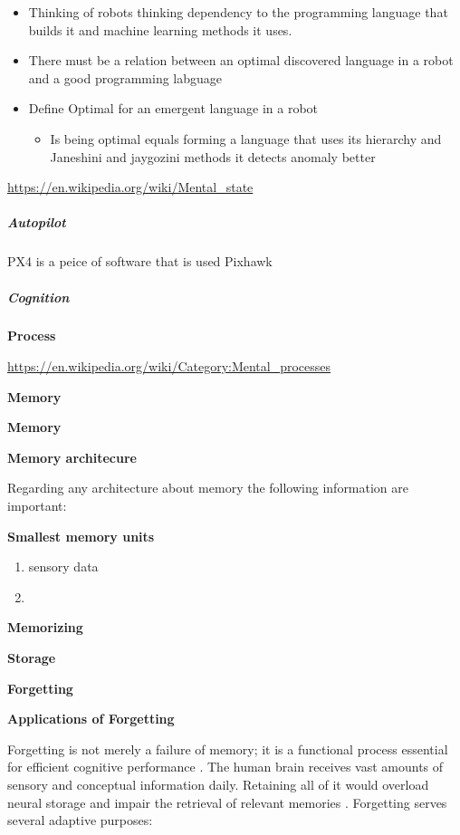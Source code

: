 \documentclass{book}
\providecommand{\ProjectDeepHeading}[2]{%
    \par\medskip\noindent\textbf{#2}\par\smallskip
}
\begin{document}
\begin{itemize}
    \item Thinking of robots thinking dependency to the programming language that builds it and machine learning methods it uses.
    \item There must be a relation between an optimal discovered language in a robot and a good programming labguage
    \item Define Optimal for an emergent language in a robot
        \begin{itemize}
            \item Is being optimal equals forming a language that uses its hierarchy and Janeshini and jaygozini methods it detects anomaly better
        \end{itemize}
\end{itemize}


\url{https://en.wikipedia.org/wiki/Mental_state}

\subparagraph{Autopilot}


PX4 is a peice of software that is used Pixhawk

\subparagraph{Cognition}

\ProjectDeepHeading{1}{Process}


\url{https://en.wikipedia.org/wiki/Category:Mental_processes}

\ProjectDeepHeading{2}{Memory}


\ProjectDeepHeading{4}{Memory}

\ProjectDeepHeading{5}{Memory architecure}
Regarding any architecture about memory the following information are important:

    \ProjectDeepHeading{6}{Smallest memory units}
        \begin{enumerate}
            \item sensory data
            \item
        \end{enumerate}
    \ProjectDeepHeading{6}{Memorizing}

    \ProjectDeepHeading{6}{Storage}

    \ProjectDeepHeading{6}{Forgetting}
        \ProjectDeepHeading{7}{Applications of Forgetting}
        Forgetting is not merely a failure of memory; it is a functional process essential for efficient cognitive performance \cite{hardt-2013-decay-happens}.
        The human brain receives vast amounts of sensory and conceptual information daily.
        Retaining all of it would overload neural storage and impair the retrieval of relevant memories .
        Forgetting serves several adaptive purposes:
\end{document}
